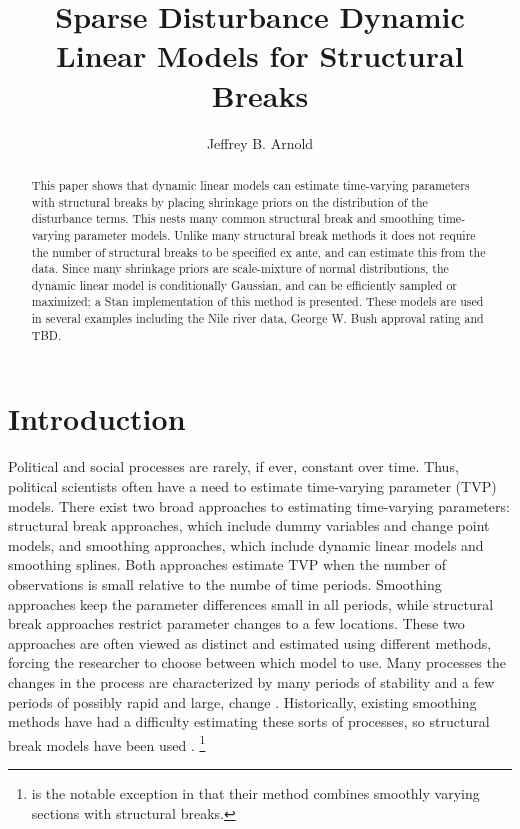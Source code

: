 \documentclass{article}
\author{Jeffrey B. Arnold}
\title{Sparse Disturbance Dynamic Linear Models for Structural Breaks}
\begin{document}
\maketitle{}

\begin{abstract}
  This paper shows that dynamic linear models can estimate time-varying parameters with structural breaks by placing shrinkage priors on the distribution of the disturbance terms. 
  This nests many common structural break and smoothing time-varying parameter models.
  Unlike many structural break methods it does not require the number of structural breaks to be specified ex ante, and can estimate this from the data.
  Since many shrinkage priors are scale-mixture of normal distributions, the dynamic linear model is conditionally Gaussian, and can be efficiently sampled or maximized; 
  a Stan implementation of this method is presented.
  These models are used in several examples including the Nile river data, George W. Bush approval rating and TBD.
\end{abstract}

\section{Introduction}
\label{sec:introduction}

Political and social processes are rarely, if ever, constant over time.
Thus, political scientists often have a need to estimate time-varying parameter (TVP) models.
There exist two broad approaches to estimating time-varying parameters: structural break approaches, which include dummy variables and change point models, and smoothing approaches, which include dynamic linear models and smoothing splines.
Both approaches estimate TVP when the number of observations is small relative to the numbe of time periods. 
Smoothing approaches keep the parameter differences small in all periods, while structural break approaches restrict parameter changes to a few locations.
These two approaches are often viewed as distinct and estimated using different methods, forcing the researcher to choose between which model to use.
Many processes the changes in the process are characterized by many periods of stability and a few periods of possibly rapid and large, change \parencite{RatkovicEng2010}.
Historically, existing smoothing methods have had a difficulty estimating these sorts of processes, so structural break models have been used \parencites{CalderiaZorn1998}{Spirling2007a}{Spirling2007b}{Park2010}{Park2011}.%
\footnote{\textcite{RatkovicEng2010} is the notable exception in that their method combines smoothly varying sections with structural breaks.}
\end{document}
